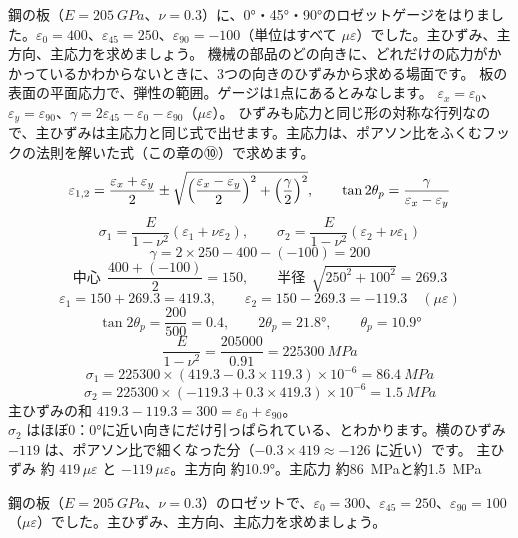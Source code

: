 \begin{phreidai}[ロゼットゲージから主応力を求める]
\label{ph:力-9:ex10}鋼の板（$E=\qty{205}{GPa}$、$\nu=0.3$）に、0°・45°・90°のロゼットゲージをはりました。$\varepsilon_0=400$、$\varepsilon_{45}=250$、$\varepsilon_{90}=-100$（単位はすべて $\mu\varepsilon$）でした。主ひずみ、主方向、主応力を求めましょう。
\phbamen
機械の部品のどの向きに、どれだけの応力がかかっているかわからないときに、3つの向きのひずみから求める場面です。
\phmushi
板の表面の平面応力で、弾性の範囲。ゲージは1点にあるとみなします。
\phzu
$\varepsilon_x=\varepsilon_0$、$\varepsilon_y=\varepsilon_{90}$、$\gamma=2\varepsilon_{45}-\varepsilon_0-\varepsilon_{90}$（$\mu\varepsilon$）。
\phriyu
ひずみも応力と同じ形の対称な行列なので、主ひずみは主応力と同じ式で出せます。主応力は、ポアソン比をふくむフックの法則を解いた式（この章の⑩）で求めます。
\phtateru
\[\varepsilon_{1,2}=\frac{\varepsilon_x+\varepsilon_y}{2}\pm\sqrt{\Bigl(\frac{\varepsilon_x-\varepsilon_y}{2}\Bigr)^2+\Bigl(\frac{\gamma}{2}\Bigr)^2},\qquad\tan2\theta_p=\frac{\gamma}{\varepsilon_x-\varepsilon_y}\]
\[\sigma_1=\frac{E}{1-\nu^2}(\varepsilon_1+\nu\varepsilon_2),\qquad\sigma_2=\frac{E}{1-\nu^2}(\varepsilon_2+\nu\varepsilon_1)\]
\phtoku
\[\gamma=2\times250-400-(-100)=200\]
\[\text{中心}\ \ \frac{400+(-100)}{2}=150,\qquad\text{半径}\ \ \sqrt{250^2+100^2}=269.3\]
\[\varepsilon_1=150+269.3=419.3,\qquad\varepsilon_2=150-269.3=-119.3\quad(\mu\varepsilon)\]
\[\tan2\theta_p=\frac{200}{500}=0.4,\qquad2\theta_p=21.8°,\qquad\theta_p=10.9°\]
\[\frac{E}{1-\nu^2}=\frac{\num{205000}}{0.91}=\qty{225300}{MPa}\]
\[\sigma_1=\num{225300}\times(419.3-0.3\times119.3)\times10^{-6}=\qty{86.4}{MPa}\]
\[\sigma_2=\num{225300}\times(-119.3+0.3\times419.3)\times10^{-6}=\qty{1.5}{MPa}\]
\phtashikame
主ひずみの和 $419.3-119.3=300=\varepsilon_0+\varepsilon_{90}$。\\
$\sigma_2$ はほぼ0：0°に近い向きにだけ引っぱられている、とわかります。横のひずみ $-119$ は、ポアソン比で細くなった分（$-0.3\times419\approx-126$ に近い）です。
\kotae 主ひずみ 約 $419\,\mu\varepsilon$ と $-119\,\mu\varepsilon$。主方向 約10.9°。主応力 約\qty{86}{MPa}と約\qty{1.5}{MPa}
\end{phreidai}
\begin{jibun}
鋼の板（$E=\qty{205}{GPa}$、$\nu=0.3$）のロゼットで、$\varepsilon_0=300$、$\varepsilon_{45}=250$、$\varepsilon_{90}=100$（$\mu\varepsilon$）でした。主ひずみ、主方向、主応力を求めましょう。
\end{jibun}

